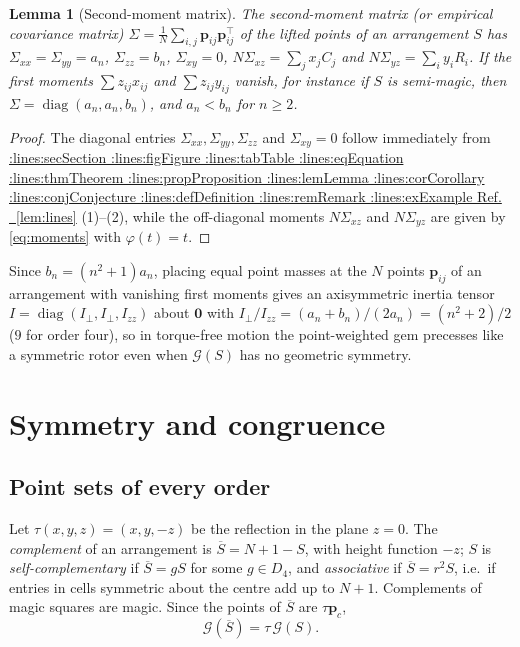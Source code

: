 \documentclass[11pt,a4paper]{article}
\makeatletter
\def\Cref@getprefix#1:#2\relax{#1}
\def\Cref@prefix@sec{sec}
\def\Cref@prefix@fig{fig}
\def\Cref@prefix@tab{tab}
\def\Cref@prefix@eq{eq}
\def\Cref@prefix@thm{thm}
\def\Cref@prefix@prop{prop}
\def\Cref@prefix@lem{lem}
\def\Cref@prefix@cor{cor}
\def\Cref@prefix@conj{conj}
\def\Cref@prefix@def{def}
\def\Cref@prefix@rem{rem}
\def\Cref@prefix@ex{ex}
\def\Cref@type@cap#1{%
  \edef\Cref@tmp{#1}%
  \ifx\Cref@tmp\Cref@prefix@sec Section%
  \else\ifx\Cref@tmp\Cref@prefix@fig Figure%
  \else\ifx\Cref@tmp\Cref@prefix@tab Table%
  \else\ifx\Cref@tmp\Cref@prefix@eq Equation%
  \else\ifx\Cref@tmp\Cref@prefix@thm Theorem%
  \else\ifx\Cref@tmp\Cref@prefix@prop Proposition%
  \else\ifx\Cref@tmp\Cref@prefix@lem Lemma%
  \else\ifx\Cref@tmp\Cref@prefix@cor Corollary%
  \else\ifx\Cref@tmp\Cref@prefix@conj Conjecture%
  \else\ifx\Cref@tmp\Cref@prefix@def Definition%
  \else\ifx\Cref@tmp\Cref@prefix@rem Remark%
  \else\ifx\Cref@tmp\Cref@prefix@ex Example%
  \else Ref.%
  \fi\fi\fi\fi\fi\fi\fi\fi\fi\fi\fi\fi
}
\DeclareRobustCommand{\Cref}[1]{%
  \begingroup
  \edef\Cref@label{#1}%
  \edef\Cref@prefix{\expandafter\Cref@getprefix\Cref@label:\relax}%
  \hyperref[#1]{\Cref@type@cap{\Cref@prefix}~\ref*{#1}}%
  \endgroup
}
\theoremstyle{plain}
\newtheorem{lemma}[theorem]{Lemma}
\theoremstyle{definition}
\theoremstyle{remark}
\makeatother
\begin{document}
\begin{lemma}[Second-moment matrix]
\label{lem:cov}
The second-moment matrix (or empirical covariance matrix) $\Sigma=\frac1N\sum_{i,j}\mathbf p_{ij}\mathbf p_{ij}^{\top}$ of the lifted points of an arrangement $S$ has $\Sigma_{xx}=\Sigma_{yy}=a_n$, $\Sigma_{zz}=b_n$, $\Sigma_{xy}=0$, $N\Sigma_{xz}=\sum_jx_jC_j$ and $N\Sigma_{yz}=\sum_iy_iR_i$. If the first moments $\sum z_{ij}x_{ij}$ and $\sum z_{ij}y_{ij}$ vanish, for instance if $S$ is semi-magic, then $\Sigma=\operatorname{diag}(a_n,a_n,b_n)$, and $a_n<b_n$ for $n\ge2$.
\end{lemma}

\begin{proof}
The diagonal entries $\Sigma_{xx},\Sigma_{yy},\Sigma_{zz}$ and $\Sigma_{xy}=0$ follow immediately from \Cref{lem:lines}(1)--(2), while the off-diagonal moments $N\Sigma_{xz}$ and $N\Sigma_{yz}$ are given by \eqref{eq:moments} with $\varphi(t)=t$.
\end{proof}

Since $b_n=(n^2+1)a_n$, placing equal point masses at the $N$ points $\mathbf p_{ij}$ of an arrangement with vanishing first moments gives an axisymmetric inertia tensor $I=\operatorname{diag}(I_\perp,I_\perp,I_{zz})$ about $\mathbf 0$ with $I_\perp/I_{zz}=(a_n+b_n)/(2a_n)=(n^2+2)/2$ ($9$ for order four), so in torque-free motion the point-weighted gem precesses like a symmetric rotor even when $\mathcal G(S)$ has no geometric symmetry.

\section{Symmetry and congruence}
\label{sec:symmetry}
\label{sec:symmetry-congruence}

\subsection{Point sets of every order}
\label{sec:pointsets}

Let $\tau(x,y,z)=(x,y,-z)$ be the reflection in the plane $z=0$.
The \emph{complement} of an arrangement is $\overline S=N+1-S$, with height function $-z$; $S$ is \emph{self-complementary} if $\overline S=gS$ for some $g\in D_4$, and \emph{associative} if $\overline S=r^2S$, i.e.\ if entries in cells symmetric about the centre add up to $N+1$.
Complements of magic squares are magic.
Since the points of $\overline S$ are $\tau\mathbf p_c$,
\begin{equation}
\mathcal G(\overline S)=\tau\,\mathcal G(S).
\label{eq:complement}
\end{equation}
\end{document}
